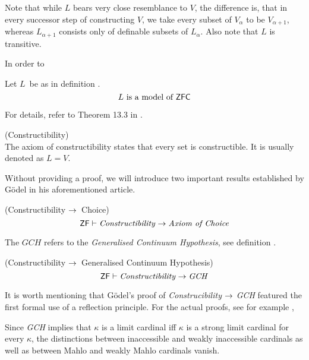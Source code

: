Note that while $L$ bears very close resemblance to $V$, the difference is, that in every successor step of constructing $V$, we take every subset of $V_\alpha$ to be $V_{\alpha+1}$, whereas $L_{\alpha+1}$ consists only of definable subsets of $L_\alpha$. Also note that $L$ is transitive.

In order to 

\begin{theorem}
Let $L$ be as in definition .
\begin{equation}
L\mbox{ is a model of \sf{ZFC}}
\end{equation}
\end{theorem}
For details, refer to Theorem 13.3 in \cite{JechBook}.

\begin{definition}{(Constructibility)}\\
The axiom of constructibility states that every set is constructible. It is usually denoted as $L = V$.
\end{definition}

Without providing a proof, we will introduce two important results established by Gödel in his aforementioned article. 

\begin{theorem}{(Constructibility $\rightarrow$ Choice)}
\begin{equation}
\sf{ZF} \vdash \mbox{\emph{Constructibility}} \rightarrow \mbox{\emph{Axiom of Choice}} 
\end{equation}
\end{theorem}

The $GCH$ refers to the \emph{Generalised Continuum Hypothesis}, see definition .
\begin{theorem}{(Constructibility $\rightarrow$ Generalised Continuum Hypothesis)}\label{theorem:l_then_gch}
\begin{equation}
\sf{ZF} \vdash \mbox{\emph{Constructibility}} \rightarrow \mbox{\emph{GCH}} 
\end{equation}
\end{theorem}
It is worth mentioning that Gödel's proof of \emph{Construcibility} $\rightarrow$ \emph{GCH} featured the first formal use of a reflection principle. 
For the actual proofs, see for example \cite{Kunen_independence},

Since \emph{GCH} implies that $\kappa$ is a limit cardinal iff $\kappa$ is a strong limit cardinal for every $\kappa$, the distinctions between inaccessible and weakly inaccessible cardinals as well as between Mahlo and weakly Mahlo cardinals vanish.

